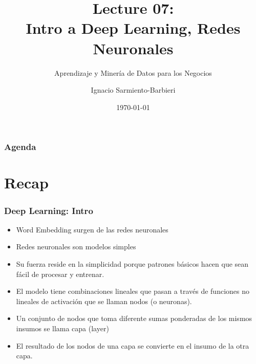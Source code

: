 \documentclass[
  shownotes,
  xcolor={svgnames},
  hyperref={colorlinks,citecolor=DarkBlue,linkcolor=DarkRed,urlcolor=DarkBlue}
  , aspectratio=169]{beamer}
\begin{document}
\title[Lecture 07]{Lecture 07: \\ Intro a Deep Learning, Redes Neuronales }
\subtitle{Aprendizaje y Minería de Datos para los Negocios}
\date{\today}

\author[Sarmiento-Barbieri]{Ignacio Sarmiento-Barbieri}


\begin{frame}[noframenumbering]
\maketitle
\end{frame}





\begin{frame}
\frametitle{Agenda}

\tableofcontents

\end{frame}
\section{Recap}

\begin{frame}
\frametitle{Deep Learning: Intro}

\begin{itemize}
    \item Word Embedding surgen de las redes neuronales
    \medskip
  \item Redes neuronales son modelos simples
  \medskip
  \item Su fuerza reside en la simplicidad porque patrones básicos hacen que sean fácil de procesar y entrenar. 
  \medskip
  \item El modelo tiene combinaciones lineales que pasan a través de funciones no lineales de activación que se llaman nodos (o neuronas). 
  \medskip
  \item Un conjunto de nodos que toma diferente sumas ponderadas de los mismos insumos se llama capa (layer)
  \medskip
  \item  El resultado de los nodos de una capa se convierte en el insumo de la otra capa. 
\end{itemize}

\end{frame}
\end{document}
